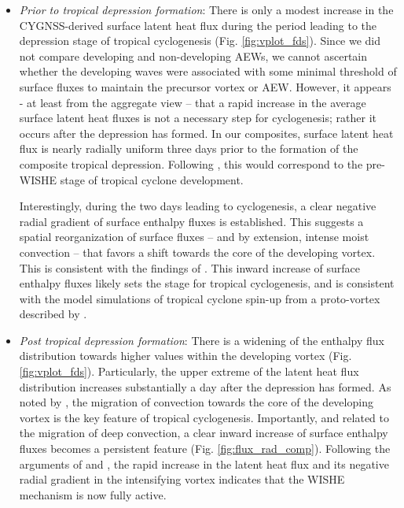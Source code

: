 \documentclass[draft]{agujournal2019}
\begin{document}
\begin{itemize}
    \item \emph{Prior to tropical depression formation}: There is only a modest increase in the CYGNSS-derived surface latent heat flux during the period leading to the depression stage of tropical cyclogenesis (Fig. \ref{fig:vplot_fds}).  Since we did not compare developing and non-developing AEWs, we cannot ascertain whether the developing waves were associated with some minimal threshold of surface fluxes to maintain the precursor vortex or AEW. However, it appears - at least from the aggregate view -- that a rapid increase in the average surface latent heat fluxes is not a necessary step for cyclogenesis; rather it occurs after the depression has formed.  In our composites, surface latent heat flux is   nearly radially uniform three days prior to the formation of the composite tropical depression. Following  , this would correspond to the pre-WISHE stage of tropical cyclone development. 
    
    Interestingly, during the two days leading to cyclogenesis, a clear negative radial gradient of surface enthalpy fluxes is established. This suggests a spatial reorganization of surface fluxes -- and by extension, intense moist convection -- that favors a shift towards the core of the developing vortex. This is consistent with the findings of .  This inward increase of surface enthalpy fluxes likely sets the stage for tropical cyclogenesis, and is consistent with the model simulations of tropical cyclone spin-up from a proto-vortex described by . 

    \item \emph{Post tropical depression formation}: There is a widening of the enthalpy flux distribution towards higher values within the developing vortex (Fig. \ref{fig:vplot_fds}). Particularly, the upper extreme of the latent heat flux distribution increases substantially a day after the depression has formed. As noted by \cite{WZ2018}, the  migration of convection towards the core of the developing vortex is the key feature of tropical cyclogenesis. Importantly, and related to the  migration of deep convection, a clear inward increase of surface enthalpy fluxes becomes a persistent feature (Fig. \ref{fig:flux_rad_comp}).  Following the arguments of   and , the rapid increase in the latent heat flux and its negative  radial gradient in the  intensifying vortex indicates that the WISHE mechanism is now fully active.
\end{itemize}
\end{document}
